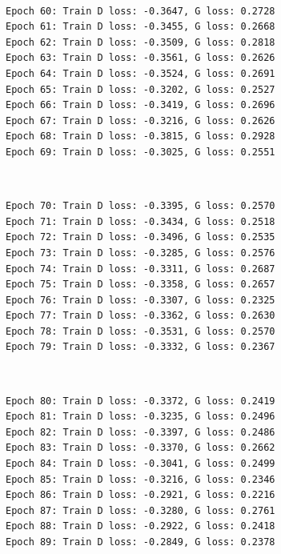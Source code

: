 \documentclass[11pt]{article}
\begin{document}
    \begin{center}
    \end{center}
    { \hspace*{\fill} \\}
    
    \begin{Verbatim}[commandchars=\\\{\}]
Epoch 60: Train D loss: -0.3647, G loss: 0.2728
Epoch 61: Train D loss: -0.3455, G loss: 0.2668
Epoch 62: Train D loss: -0.3509, G loss: 0.2818
Epoch 63: Train D loss: -0.3561, G loss: 0.2626
Epoch 64: Train D loss: -0.3524, G loss: 0.2691
Epoch 65: Train D loss: -0.3202, G loss: 0.2527
Epoch 66: Train D loss: -0.3419, G loss: 0.2696
Epoch 67: Train D loss: -0.3216, G loss: 0.2626
Epoch 68: Train D loss: -0.3815, G loss: 0.2928
Epoch 69: Train D loss: -0.3025, G loss: 0.2551

    \end{Verbatim}

    \begin{center}
    \end{center}
    { \hspace*{\fill} \\}
    
    \begin{Verbatim}[commandchars=\\\{\}]
Epoch 70: Train D loss: -0.3395, G loss: 0.2570
Epoch 71: Train D loss: -0.3434, G loss: 0.2518
Epoch 72: Train D loss: -0.3496, G loss: 0.2535
Epoch 73: Train D loss: -0.3285, G loss: 0.2576
Epoch 74: Train D loss: -0.3311, G loss: 0.2687
Epoch 75: Train D loss: -0.3358, G loss: 0.2657
Epoch 76: Train D loss: -0.3307, G loss: 0.2325
Epoch 77: Train D loss: -0.3362, G loss: 0.2630
Epoch 78: Train D loss: -0.3531, G loss: 0.2570
Epoch 79: Train D loss: -0.3332, G loss: 0.2367

    \end{Verbatim}

    \begin{center}
    \end{center}
    { \hspace*{\fill} \\}
    
    \begin{Verbatim}[commandchars=\\\{\}]
Epoch 80: Train D loss: -0.3372, G loss: 0.2419
Epoch 81: Train D loss: -0.3235, G loss: 0.2496
Epoch 82: Train D loss: -0.3397, G loss: 0.2486
Epoch 83: Train D loss: -0.3370, G loss: 0.2662
Epoch 84: Train D loss: -0.3041, G loss: 0.2499
Epoch 85: Train D loss: -0.3216, G loss: 0.2346
Epoch 86: Train D loss: -0.2921, G loss: 0.2216
Epoch 87: Train D loss: -0.3280, G loss: 0.2761
Epoch 88: Train D loss: -0.2922, G loss: 0.2418
Epoch 89: Train D loss: -0.2849, G loss: 0.2378

    \end{Verbatim}
\end{document}
